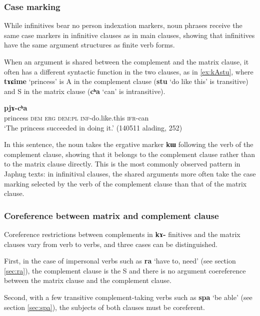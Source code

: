 \documentclass[oneside,a4paper,11pt]{article}
\newcommand{\ipa}[1]{\textbf{\phon#1}} %
\newcommand{\jpg}[2]{\ipa{#1} `#2'} %
\begin{document}
\subsubsection{Case marking} \label{sec:case.infinitive}
While infinitives bear no person indexation markers, noun phrases receive the same case markers in infinitive clauses as in main clauses, showing that infinitives have the same argument structures as finite verb forms.

When an argument is shared between the complement and the matrix clause, it often has a different syntactic function in the two clauses, as in \ref{ex:kAstu}, where \ipa{tɤɕime} `princess' is A in the complement clause (\jpg{stu}{do like this} is transitive) and S in the matrix clause (\jpg{cʰa}{can} is intransitive). 

\begin{exe}
\ex \label{ex:kAstu}
\gll [\ipa{tɤɕime} 	\ipa{nɯ} 	\ipa{kɯ} 	\ipa{nɯra} 	\ipa{kɤ-stu}] 	\ipa{pjɤ-cʰa} \\
princess \textsc{dem} \textsc{erg} \textsc{dem:pl} \textsc{inf}-do.like.this \textsc{ifr}-can \\
\glt `The princess succeeded in doing it.' (140511 alading, 252)
\end{exe}

In this sentence, the noun takes the ergative marker \ipa{kɯ} following the verb of the complement clause, showing that it belongs to the complement clause rather than to the matrix clause directly. This is the most commonly observed pattern in Japhug texts: in infinitival clauses, the shared arguments more often take the case marking selected by the verb of the complement clause than that of the matrix clause.

\subsubsection{Coreference between matrix and complement clause} \label{sec:inf.coref}
Coreference restrictions between complements in \ipa{kɤ-} finitives and the matrix clauses vary from verb to verbs, and three cases can be distinguished.


First, in the case of impersonal verbs such as \jpg{ra}{have to, need} (see section \ref{sec:ra}), the complement clause is the S and there is no argument coereference between the matrix clause and the complement clause.

Second, with a few transitive complement-taking verbs such as \ipa{spa} `be able' (see section \ref{sec:spa}), the subjects of both clauses must be coreferent.
\end{document}
